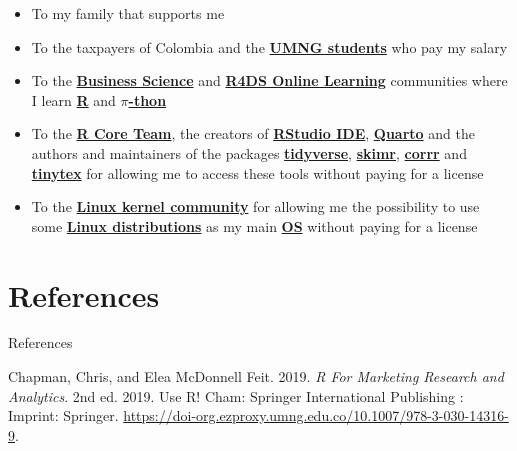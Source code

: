 \documentclass[
  ignorenonframetext,
]{beamer}
\newlength{\cslhangindent}
\newenvironment{CSLReferences}[2] %
 {\begin{list}{}{%
  \setlength{\itemindent}{0pt}
  \setlength{\leftmargin}{0pt}
  \setlength{\parsep}{0pt}
  \ifodd #1
   \setlength{\leftmargin}{\cslhangindent}
   \setlength{\itemindent}{-1\cslhangindent}
  \fi
  \setlength{\itemsep}{#2\baselineskip}}}
 {\end{list}}
\begin{document}
\begin{frame}{}
\label{section-28}
\begin{itemize}
\item
  To my family that supports me
\item
  To the taxpayers of Colombia and the
  \href{https://www.umng.edu.co/estudiante}{\textbf{UMNG students}} who
  pay my salary
\item
  To the \href{https://www.business-science.io/}{\textbf{Business
  Science}} and \href{https://www.rfordatasci.com/}{\textbf{R4DS Online
  Learning}} communities where I learn
  \href{https://www.r-project.org/about.html}{\textbf{R}} and
  \href{https://www.python.org/about/}{\textbf{\(\pi\)-thon}}
\item
  To the \href{https://www.r-project.org/contributors.html}{\textbf{R
  Core Team}}, the creators of
  \href{https://posit.co/products/open-source/rstudio/}{\textbf{RStudio
  IDE}}, \href{https://quarto.org/}{\textbf{Quarto}} and the authors and
  maintainers of the packages
  \href{https://CRAN.R-project.org/package=tidyverse}{\textbf{tidyverse}},
  \href{https://CRAN.R-project.org/package=skimr}{\textbf{skimr}},
  \href{https://CRAN.R-project.org/package=corrr}{\textbf{corrr}} and
  \href{https://CRAN.R-project.org/package=tinytex}{\textbf{tinytex}}
  for allowing me to access these tools without paying for a license
\item
  To the \href{https://www.kernel.org/category/about.html}{\textbf{Linux
  kernel community}} for allowing me the possibility to use some
  \href{https://static.lwn.net/Distributions/}{\textbf{Linux
  distributions}} as my main
  \href{https://en.wikipedia.org/wiki/Operating_system}{\textbf{OS}}
  without paying for a license
\end{itemize}
\end{frame}

\section*{References}\label{references}

\begin{frame}{References}
\label{refs}
\begin{CSLReferences}{1}{0}
Chapman, Chris, and Elea McDonnell Feit. 2019. \emph{R {For} {Marketing}
{Research} and {Analytics}}. 2nd ed. 2019. Use {R}! Cham: Springer
International Publishing : Imprint: Springer.
\url{https://doi-org.ezproxy.umng.edu.co/10.1007/978-3-030-14316-9}.

\end{CSLReferences}
\end{frame}
\end{document}
